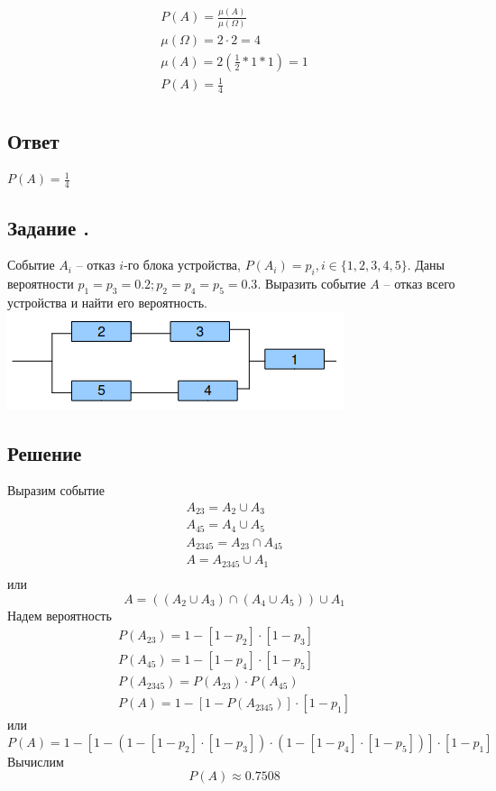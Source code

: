 \documentclass[12pt]{article}
\begin{document}
\begin{gather*}
	P(A) = \frac{\mu(A)}{\mu(\Omega)} \\
	\mu(\Omega) = 2 \cdot 2 = 4 \\
	\mu(A) = 2(\frac{1}{2} * 1 * 1) = 1 \\
	P(A) = \frac{1}{4} \\
\end{gather*}

\subsection*{Ответ}
$P(A) = \frac{1}{4}$

\newpage

\subsection{Задание .}
Событие $A_i$ -- {отказ $i$-го блока устройства}, $P(A_i) = p_i, i \in \{1,2,3,4,5\}$.
Даны вероятности $p_1 = p_3 = 0.2; p_2 = p_4 = p_5 = 0.3$.
Выразить событие $A$ -- отказ всего устройства и найти его вероятность.
\\\includegraphics{1.png}
\subsection*{Решение}
Выразим событие
\begin{gather*}
	A_{23} = A_2 \cup A_3 \\
	A_{45} = A_4 \cup A_5 \\
	A_{2345} = A_{23} \cap A_{45} \\
	A = A_{2345} \cup A_1 \\
\end{gather*}
или
\[A = ((A_2 \cup A_3) \cap (A_4 \cup A_5)) \cup A_1\]
Надем вероятность
\begin{gather*}
	P(A_{23}) = 1 - [1 - p_2] \cdot [1 - p_3] \\
	P(A_{45}) = 1 - [1 - p_4] \cdot [1 - p_5] \\
	P(A_{2345}) = P(A_{23}) \cdot P(A_{45}) \\
	P(A) = 1 - [1 - P(A_{2345})] \cdot [1 - p_1]
\end{gather*}
или
\[P(A) = 1 - [1 - \left(1 - [1 - p_2] \cdot [1 - p_3]\right) \cdot \left(1 - [1 - p_4] \cdot [1 - p_5]\right)] \cdot [1 - p_1]\]
Вычислим
\[P(A) \approx 0.7508\]
\end{document}
